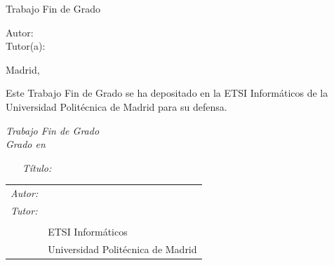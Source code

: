 \begin{titlepage}
  \vspace*{1cm}
  \begin{center}
    \huge{ Trabajo Fin de Grado }
  \end{center}

  \vspace*{0.5cm}
  \begin{center}
    \huge\bfseries {  \TituloTFG{} }
  \end{center}

  \vspace*{5cm}

  \noindent
  \large{Autor: \NombreAutor{} }\\
  \large{Tutor(a): \NombreTutor{} }


  \vspace*{4cm}
  \begin{center}
    Madrid, \Fecha
  \end{center}

  \newpage
  \thispagestyle{empty}
  \noindent
  Este Trabajo Fin de Grado se ha depositado en la ETSI Informáticos de la Universidad Politécnica de Madrid para su defensa.

  \vspace*{4cm}
  \noindent
  \textit{Trabajo Fin de Grado}\\
  \textit{Grado en} \Grado{}

  \begin{enumerate}
    \item[\textit{Título:}] \TituloTFG{}
  \end{enumerate}
  \Fecha


  \vspace*{3cm}

  \noindent
  \begin{tabular}{ll}
    \textit{Autor:} & \NombreAutor{}                    \\
    \textit{Tutor:} & \NombreTutor{}                    \\
                    & \Departamento{}                   \\
                    & ETSI Informáticos                 \\
                    & Universidad Politécnica de Madrid
  \end{tabular}

\end{titlepage}
